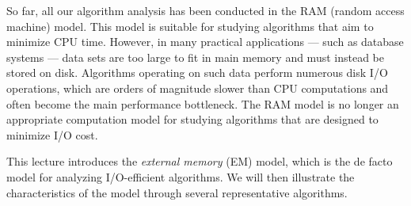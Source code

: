 



\usepackage{wasysym}

\title{}
\author{}
\date{}


\def\C{\mathcal{C}}
\def\E{\mathcal{E}}
\def\FF{\EuScript{F}}
\def\G{\mathcal{G}}
\def\GG{\EuScript{G}}
\def\H{\mathcal{H}}
\def\I{\mathcal{I}}
\def\J{\mathcal{J}}
\def\L{\mathcal{L}}
\def\Q{\mathcal{Q}}
\def\S{\mathcal{S}}
\def\T{\mathcal{T}}
\def\V{\mathcal{V}}
\def\W{\mathscr{W}}
\def\X{\mathcal{X}}
\def\Y{\mathcal{Y}}
\def\Z{\mathcal{Z}}
\def\att{\mit{diffatt}}
\def\agm{\mathit{AGM}}
\def\boldatt{\mathbf{att}}
\def\ext{\mathit{ext}}
\def\In{\mathrm{IN}}
\def\join{\mathit{join}}
\def\Out{\mathrm{OUT}}
\def\schema{\mathit{schema}}

\def\extraspacing{\vspace{4mm} \noindent}
\def\vgap{\vspace{4mm}}
\def\vslit{\vspace{2mm}}





So far, all our algorithm analysis has been conducted in the RAM (random access machine) model. This model is suitable for studying algorithms that aim to minimize CPU time. However, in many practical applications --- such as database systems --- data sets are too large to fit in main memory and must instead be stored on disk. Algorithms operating on such data perform numerous disk I/O operations, which are orders of magnitude slower than CPU computations and often become the main performance bottleneck. The RAM model is no longer an appropriate computation model for studying algorithms that are designed to minimize I/O cost.

\vgap

This lecture introduces the {\em external memory} (EM) model, which is the de facto model for analyzing I/O-efficient algorithms. We will then illustrate the characteristics of the model through several representative algorithms.

